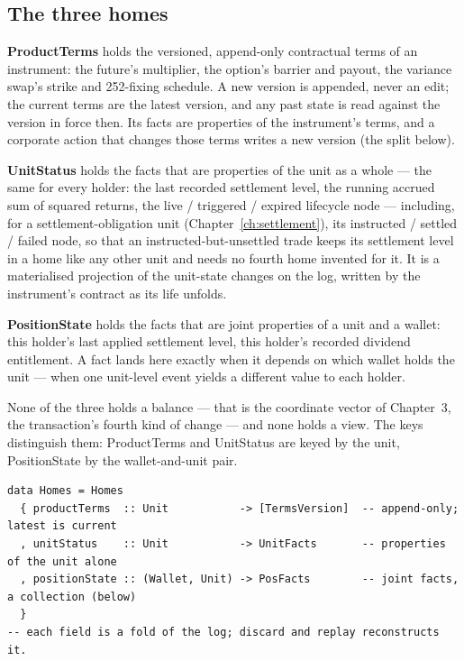 \documentclass[11pt,a4paper]{article}
\begin{document}
\subsection{The three homes}

\textbf{ProductTerms} holds the versioned, append-only contractual terms of an
instrument: the future's multiplier, the option's barrier and payout, the variance swap's
strike and 252-fixing schedule. A new version is appended, never an edit; the current
terms are the latest version, and any past state is read against the version in force
then. Its facts are properties of the instrument's terms, and a corporate action that
changes those terms writes a new version (the split below).

\textbf{UnitStatus} holds the facts that are properties of the unit as a whole --- the
same for every holder: the last recorded settlement level, the running accrued sum of
squared returns, the live / triggered / expired lifecycle node --- including, for a
settlement-obligation unit (Chapter~\ref{ch:settlement}), its instructed / settled /
failed node, so that an instructed-but-unsettled trade keeps its settlement level in a
home like any other unit and needs no fourth home invented for it. It is a materialised
projection of the unit-state changes on the log, written by the instrument's contract as
its life unfolds.

\textbf{PositionState} holds the facts that are joint properties of a unit and a wallet:
this holder's last applied settlement level, this holder's recorded dividend entitlement.
A fact lands here exactly when it depends on which wallet holds the unit --- when one
unit-level event yields a different value to each holder.

None of the three holds a balance --- that is the coordinate vector of
Chapter~3, the transaction's fourth kind of change --- and none holds a
view. The keys distinguish them: ProductTerms and UnitStatus are keyed by the unit,
PositionState by the wallet-and-unit pair.

\begin{lstlisting}
data Homes = Homes
  { productTerms  :: Unit           -> [TermsVersion]  -- append-only; latest is current
  , unitStatus    :: Unit           -> UnitFacts       -- properties of the unit alone
  , positionState :: (Wallet, Unit) -> PosFacts        -- joint facts, a collection (below)
  }
-- each field is a fold of the log; discard and replay reconstructs it.
\end{lstlisting}
\end{document}
